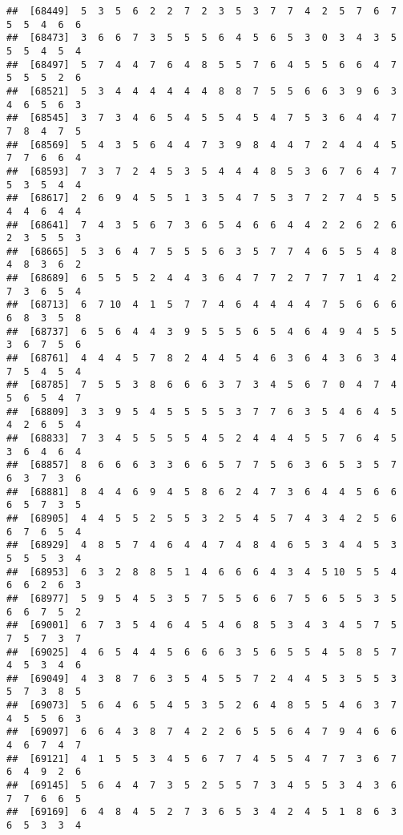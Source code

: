 \documentclass[
]{book}
\begin{document}
\begin{verbatim}
##  [68449]  5  3  5  6  2  2  7  2  3  5  3  7  7  4  2  5  7  6  7  5  5  4  6  6
##  [68473]  3  6  6  7  3  5  5  5  6  4  5  6  5  3  0  3  4  3  5  5  5  4  5  4
##  [68497]  5  7  4  4  7  6  4  8  5  5  7  6  4  5  5  6  6  4  7  5  5  5  2  6
##  [68521]  5  3  4  4  4  4  4  4  8  8  7  5  5  6  6  3  9  6  3  4  6  5  6  3
##  [68545]  3  7  3  4  6  5  4  5  5  4  5  4  7  5  3  6  4  4  7  7  8  4  7  5
##  [68569]  5  4  3  5  6  4  4  7  3  9  8  4  4  7  2  4  4  4  5  7  7  6  6  4
##  [68593]  7  3  7  2  4  5  3  5  4  4  4  8  5  3  6  7  6  4  7  5  3  5  4  4
##  [68617]  2  6  9  4  5  5  1  3  5  4  7  5  3  7  2  7  4  5  5  4  4  6  4  4
##  [68641]  7  4  3  5  6  7  3  6  5  4  6  6  4  4  2  2  6  2  6  2  3  5  5  3
##  [68665]  5  3  6  4  7  5  5  5  6  3  5  7  7  4  6  5  5  4  8  4  8  3  6  2
##  [68689]  6  5  5  5  2  4  4  3  6  4  7  7  2  7  7  7  1  4  2  7  3  6  5  4
##  [68713]  6  7 10  4  1  5  7  7  4  6  4  4  4  4  7  5  6  6  6  6  8  3  5  8
##  [68737]  6  5  6  4  4  3  9  5  5  5  6  5  4  6  4  9  4  5  5  3  6  7  5  6
##  [68761]  4  4  4  5  7  8  2  4  4  5  4  6  3  6  4  3  6  3  4  7  5  4  5  4
##  [68785]  7  5  5  3  8  6  6  6  3  7  3  4  5  6  7  0  4  7  4  5  6  5  4  7
##  [68809]  3  3  9  5  4  5  5  5  5  3  7  7  6  3  5  4  6  4  5  4  2  6  5  4
##  [68833]  7  3  4  5  5  5  5  4  5  2  4  4  4  5  5  7  6  4  5  3  6  4  6  4
##  [68857]  8  6  6  6  3  3  6  6  5  7  7  5  6  3  6  5  3  5  7  6  3  7  3  6
##  [68881]  8  4  4  6  9  4  5  8  6  2  4  7  3  6  4  4  5  6  6  6  5  7  3  5
##  [68905]  4  4  5  5  2  5  5  3  2  5  4  5  7  4  3  4  2  5  6  6  7  6  5  4
##  [68929]  4  8  5  7  4  6  4  4  7  4  8  4  6  5  3  4  4  5  3  5  5  5  3  4
##  [68953]  6  3  2  8  8  5  1  4  6  6  6  4  3  4  5 10  5  5  4  6  6  2  6  3
##  [68977]  5  9  5  4  5  3  5  7  5  5  6  6  7  5  6  5  5  3  5  6  6  7  5  2
##  [69001]  6  7  3  5  4  6  4  5  4  6  8  5  3  4  3  4  5  7  5  7  5  7  3  7
##  [69025]  4  6  5  4  4  5  6  6  6  3  5  6  5  5  4  5  8  5  7  4  5  3  4  6
##  [69049]  4  3  8  7  6  3  5  4  5  5  7  2  4  4  5  3  5  5  3  5  7  3  8  5
##  [69073]  5  6  4  6  5  4  5  3  5  2  6  4  8  5  5  4  6  3  7  4  5  5  6  3
##  [69097]  6  6  4  3  8  7  4  2  2  6  5  5  6  4  7  9  4  6  6  4  6  7  4  7
##  [69121]  4  1  5  5  3  4  5  6  7  7  4  5  5  4  7  7  3  6  7  6  4  9  2  6
##  [69145]  5  6  4  4  7  3  5  2  5  5  7  3  4  5  5  3  4  3  6  7  7  6  6  5
##  [69169]  6  4  8  4  5  2  7  3  6  5  3  4  2  4  5  1  8  6  3  6  5  3  3  4

\end{verbatim}
\end{document}
